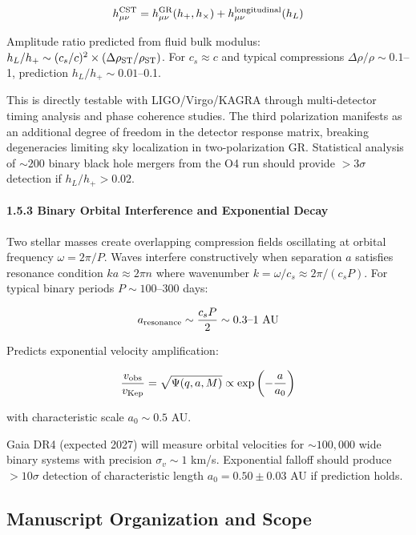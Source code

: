 \documentclass[11pt,a4paper]{article}
\begin{document}
\[h_{\mu\nu}^{\rm CST} = h_{\mu\nu}^{\rm GR}(h_+, h_\times) + h_{\mu\nu}^{\rm longitudinal}(h_L)\]

Amplitude ratio predicted from fluid bulk modulus:
\(h_L/h_+ \sim (c_s/c)^2 \times (\Delta\rho_{\rm ST}/\rho_{\rm ST})\).
For \(c_s \approx c\) and typical compressions
\(\Delta\rho/\rho \sim 0.1\)--1, prediction \(h_L/h_+ \sim 0.01\)--0.1.

This is directly testable with LIGO/Virgo/KAGRA through multi-detector
timing analysis and phase coherence studies. The third polarization
manifests as an additional degree of freedom in the detector response
matrix, breaking degeneracies limiting sky localization in
two-polarization GR. Statistical analysis of \(\sim 200\) binary black
hole mergers from the O4 run should provide \(>3\sigma\) detection if
\(h_L/h_+ > 0.02\).

\hypertarget{binary-orbital-interference-and-exponential-decay}{%
\paragraph{1.5.3 Binary Orbital Interference and Exponential
Decay}\label{binary-orbital-interference-and-exponential-decay}}

Two stellar masses create overlapping compression fields oscillating at
orbital frequency \(\omega = 2\pi/P\). Waves interfere constructively
when separation \(a\) satisfies resonance condition
\(ka \approx 2\pi n\) where wavenumber
\(k = \omega/c_s \approx 2\pi/(c_s P)\). For typical binary periods
\(P \sim 100\)--300 days:

\[a_{\rm resonance} \sim \frac{c_s P}{2} \sim 0.3\text{--}1~{\rm AU}\]

Predicts exponential velocity amplification:

\[\frac{v_{\rm obs}}{v_{\rm Kep}} = \sqrt{\Psi(q,a,M)} \propto \exp\left(-\frac{a}{a_0}\right)\]

with characteristic scale \(a_0 \sim 0.5\) AU.

Gaia DR4 (expected 2027) will measure orbital velocities for
\(\sim 100,000\) wide binary systems with precision \(\sigma_v \sim 1\)
km/s. Exponential falloff should produce \(>10\sigma\) detection of
characteristic length \(a_0 = 0.50 \pm 0.03\) AU if prediction holds.

\hypertarget{manuscript-organization-and-scope}{%
\subsection{Manuscript Organization and
Scope}\label{manuscript-organization-and-scope}}
\end{document}
